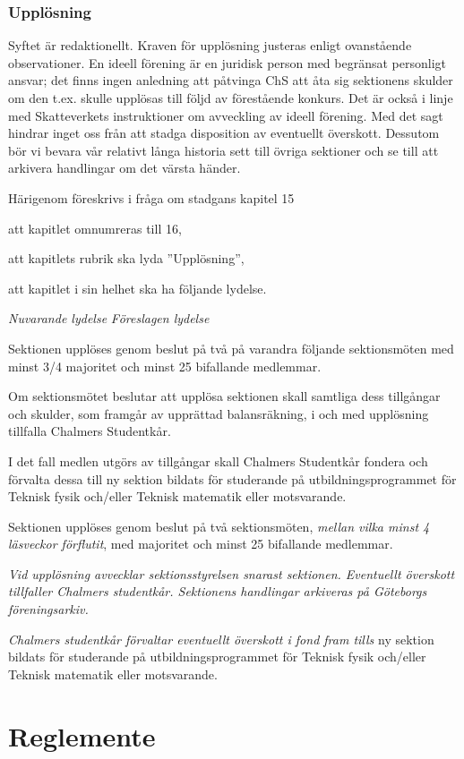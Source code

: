 \documentclass{article}
\newenvironment{lydelse}
    {\begin{paracol}{2}%
        \emph{Nuvarande lydelse}%
        \switchcolumn%
        \emph{Föreslagen lydelse}%
    \end{paracol}%
    \begin{enumerate}[label=\thesubsection.\arabic*]%
    \begin{paracol}{2}%
    }{\end{paracol}\end{enumerate}}
\begin{document}
\section{Upplösning}
Syftet är redaktionellt.
Kraven för upplösning justeras enligt ovanstående observationer.
En ideell förening är en juridisk person med begränsat personligt ansvar; det finns ingen anledning att påtvinga ChS att åta sig sektionens skulder om den t.ex. skulle upplösas till följd av förestående konkurs.
Det är också i linje med Skatteverkets instruktioner om avveckling av ideell förening.
Med det sagt hindrar inget oss från att stadga disposition av eventuellt överskott.
Dessutom bör vi bevara vår relativt långa historia sett till övriga sektioner och se till att arkivera handlingar om det värsta händer.

Härigenom föreskrivs i fråga om stadgans kapitel 15
\begin{dels}
  \item att kapitlet omnumreras till 16,
  \item att kapitlets rubrik ska lyda ''Upplösning'',
  \item att kapitlet i sin helhet ska ha följande lydelse.
\end{dels}
\begin{lydelse}
  \item Sektionen upplöses genom beslut på två på varandra följande sektionsmöten med minst 3/4 majoritet och minst 25 bifallande medlemmar.
  \item Om sektionsmötet beslutar att upplösa sektionen skall samtliga dess tillgångar och skulder, som framgår av upprättad balansräkning, i och med upplösning tillfalla Chalmers Studentkår.
  \item I det fall medlen utgörs av tillgångar skall Chalmers Studentkår fondera och förvalta dessa till ny sektion bildats för studerande på utbildningsprogrammet för Teknisk fysik och/eller Teknisk matematik eller motsvarande.
  \switchcolumn
  \item Sektionen upplöses genom beslut på två sektionsmöten, \emph{mellan vilka minst 4 läsveckor förflutit}, med  majoritet och minst 25 bifallande medlemmar.
  \item \emph{Vid upplösning avvecklar sektionsstyrelsen snarast sektionen.
      Eventuellt överskott tillfaller Chalmers studentkår.
      Sektionens handlingar arkiveras på Göteborgs föreningsarkiv.}
  \item \emph{Chalmers studentkår förvaltar eventuellt överskott i fond fram tills} ny sektion bildats för studerande på utbildningsprogrammet för Teknisk fysik och/eller Teknisk matematik eller motsvarande.
\end{lydelse}

\clearpage
\part{Reglemente}
\end{document}

